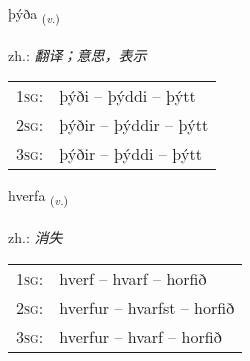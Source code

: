 \documentclass[frontgrid, backgrid]{flacards}\usepackage[]{graphicx}\usepackage[]{xcolor}
\begin{document}
\renewcommand{\flhead}{\vskip5pt \fboxsep=0pt {\small\bfseries\footnotesize Sagnorð | 动词}}
\renewcommand{\fcfoot}{\vskip5pt \fboxsep=0pt \hspace{2pt}{\small\bfseries\footnotesize 1K}}

\renewcommand{\blhead}{\vskip5pt {\small\bfseries\footnotesize Sagnorð | 动词 }}
\renewcommand{\bcfoot}{\vskip5pt \hspace{2pt}{\small\bfseries\footnotesize 1K}}


{þýða \small{\textsubscript{(\textit{v.})}} \\[1ex] %
\textphonetic{[θiːða]} \\
zh.: \emph{翻译；意思，表示} \\  [2ex]
\renewcommand*{\arraystretch}{0.8}
\begin{tabular}{p{1cm}l}
\textsc{1sg}: & þýði -- þýddi -- þýtt \\ 
\textsc{2sg}: & þýðir -- þýddir -- þýtt \\ 
\textsc{3sg}: & þýðir -- þýddi -- þýtt \\ 
\end{tabular}
}

\renewcommand{\flhead}{\vskip5pt \fboxsep=0pt {\small\bfseries\footnotesize Sagnorð | 动词}}
\renewcommand{\fcfoot}{\vskip5pt \fboxsep=0pt \hspace{2pt}{\small\bfseries\footnotesize 1K}}

\renewcommand{\blhead}{\vskip5pt {\small\bfseries\footnotesize Sagnorð | 动词 }}
\renewcommand{\bcfoot}{\vskip5pt \hspace{2pt}{\small\bfseries\footnotesize 1K}}


{hverfa \small{\textsubscript{(\textit{v.})}} \\[1ex] %
\textphonetic{[kʰvɛrva]} \\
zh.: \emph{消失} \\  [2ex]
\renewcommand*{\arraystretch}{0.8}
\begin{tabular}{p{1cm}l}
\textsc{1sg}: & hverf -- hvarf -- horfið \\ 
\textsc{2sg}: & hverfur -- hvarfst -- horfið \\ 
\textsc{3sg}: & hverfur -- hvarf -- horfið \\ 
\end{tabular}
}
\end{document}
